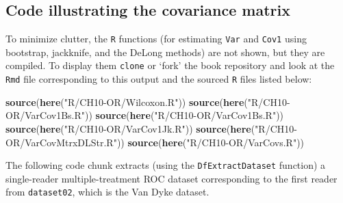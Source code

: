 \documentclass[
]{book}
\newenvironment{Shaded}{\begin{snugshade}}{\end{snugshade}}
\newcommand{\CommentTok}[1]{\textcolor[rgb]{0.56,0.35,0.01}{\textit{#1}}}
\newcommand{\DataTypeTok}[1]{\textcolor[rgb]{0.13,0.29,0.53}{#1}}
\newcommand{\DecValTok}[1]{\textcolor[rgb]{0.00,0.00,0.81}{#1}}
\newcommand{\KeywordTok}[1]{\textcolor[rgb]{0.13,0.29,0.53}{\textbf{#1}}}
\newcommand{\NormalTok}[1]{#1}
\newcommand{\OperatorTok}[1]{\textcolor[rgb]{0.81,0.36,0.00}{\textbf{#1}}}
\newcommand{\StringTok}[1]{\textcolor[rgb]{0.31,0.60,0.02}{#1}}
\begin{document}
\hypertarget{code-illustrating-the-covariance-matrix}{%
\subsection{Code illustrating the covariance matrix}\label{code-illustrating-the-covariance-matrix}}

To minimize clutter, the \texttt{R} functions (for estimating \texttt{Var} and \texttt{Cov1} using bootstrap, jackknife, and the DeLong methods) are not shown, but they are compiled. To display them \texttt{clone} or `fork' the book repository and look at the \texttt{Rmd} file corresponding to this output and the sourced \texttt{R} files listed below:

\begin{Shaded}
\begin{Highlighting}[]
\KeywordTok{source}\NormalTok{(}\KeywordTok{here}\NormalTok{(}\StringTok{"R/CH10{-}OR/Wilcoxon.R"}\NormalTok{))}
\KeywordTok{source}\NormalTok{(}\KeywordTok{here}\NormalTok{(}\StringTok{"R/CH10{-}OR/VarCov1Bs.R"}\NormalTok{))}
\KeywordTok{source}\NormalTok{(}\KeywordTok{here}\NormalTok{(}\StringTok{"R/CH10{-}OR/VarCov1Bs.R"}\NormalTok{))}
\KeywordTok{source}\NormalTok{(}\KeywordTok{here}\NormalTok{(}\StringTok{"R/CH10{-}OR/VarCov1Jk.R"}\NormalTok{)) }
\KeywordTok{source}\NormalTok{(}\KeywordTok{here}\NormalTok{(}\StringTok{"R/CH10{-}OR/VarCovMtrxDLStr.R"}\NormalTok{))}
\KeywordTok{source}\NormalTok{(}\KeywordTok{here}\NormalTok{(}\StringTok{"R/CH10{-}OR/VarCovs.R"}\NormalTok{))}
\end{Highlighting}
\end{Shaded}

The following code chunk extracts (using the \texttt{DfExtractDataset} function) a single-reader multiple-treatment ROC dataset corresponding to the first reader from \texttt{dataset02}, which is the Van Dyke dataset.

\begin{Shaded}
\end{Shaded}
\end{document}
